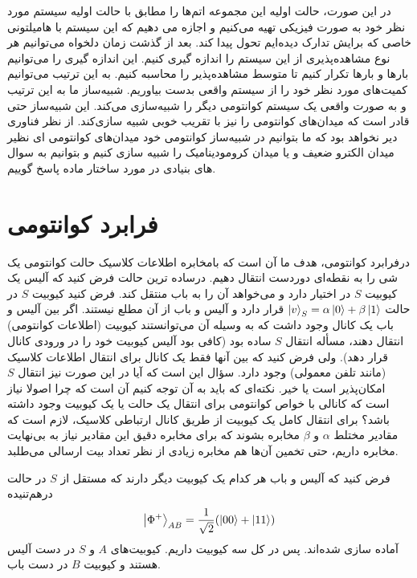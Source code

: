 در این صورت، حالت اولیه این مجموعه اتم‌ها را مطابق با حالت اولیه سیستم مورد نظر خود به صورت فیزیکی تهیه
می‌کنیم و اجازه می دهیم که این سیستم با هامیلتونی خاصی که برایش تدارک دیده‌ایم تحول پیدا کند. بعد از گذشت زمان دلخواه می‌توانیم هر
نوع مشاهده‌پذیری از این سیستم را اندازه گیری کنیم. این اندازه گیری را می‌توانیم بارها و بارها تکرار کنیم تا متوسط مشاهده‌پذیر را محاسبه
کنیم. به این ترتیب می‌توانیم کمیت‌های مورد نظر خود را از سیستم واقعی بدست بیاوریم. شبیه‌ساز ما به این ترتیب و به صورت واقعی یک سیستم کوانتومی دیگر را شبیه‌سازی می‌کند. این شبیه‌ساز حتی قادر است که میدان‌های کوانتومی را نیز با تقریب خوبی شبیه سازی‌کند. از نظر
فناوری دیر نخواهد بود که ما بتوانیم در شبیه‌ساز کوانتومی خود میدان‌های کوانتومی ای نظیر میدان الکترو ضعیف و یا میدان کرومودینامیک
 را شبیه سازی کنیم و بتوانیم به سوال های بنیادی در مورد ساختار ماده پاسخ گوییم.

\section{فرابرد کوانتومی}
درفرابرد کوانتومی، هدف ما آن است که بامخابره اطلاعات کلاسیک حالت کوانتومی یک شی را به نقطه‌ای دوردست انتقال دهیم. درساده ترین حالت فرض کنید که آلیس یک کیوبیت $S$  در اختیار دارد و می‌خواهد آن را به باب منتقل کند. فرض کنید کیوبیت $S$ در حالت $\ket{v}_{S} = \alpha \ket{0} + \beta\ket{1}$ قرار دارد و آلیس و باب از آن مطلع نیستند. اگر بین آلیس و باب یک کانال وجود داشت که به وسیله آن می‌توانستند کیوبیت (اطلاعات کوانتومی) انتقال دهند، مسأله انتقال $S$ ساده بود (کافی بود آلیس کیوبیت خود را در ورودی کانال قرار دهد). ولی فرض کنید که بین آنها فقط یک کانال برای انتقال اطلاعات کلاسیک (مانند تلفن معمولی) وجود دارد. سؤال این است که آیا در این صورت نیز انتقال $S$ امکان‌پذیر است یا خیر. نکته‌ای که باید به آن توجه کنیم آن است که چرا اصولا نیاز است که کانالی با خواص کوانتومی برای انتقال یک حالت یا یک کیوبیت وجود داشته باشد؟ برای انتقال کامل یک کیوبیت از طریق کانال ارتباطی کلاسیک، لازم است که مقادیر مختلط $\alpha$ و $\beta$ مخابره بشوند که برای مخابره دقیق این مقادیر نیاز به بی‌نهایت مخابره داریم، حتی تخمین آن‌ها هم مخابره زیادی از نظر تعداد بیت ارسالی می‌طلبد.  

فرض کنید که آلیس و باب هر کدام یک کیوبیت دیگر دارند که مستقل از $S$ در حالت درهم‌تنیده 
\begin{equation}
	\ket{\Phi^{+}}_{AB} = \frac{1}{\sqrt{2}} (\ket{00} + \ket{11} )
\end{equation}
آماده سازی شده‌اند. پس در کل سه کیوبیت داریم. کیوبیت‌های $A$ و $S$ در دست آلیس هستند و کیوبیت $B$ در دست باب. 

